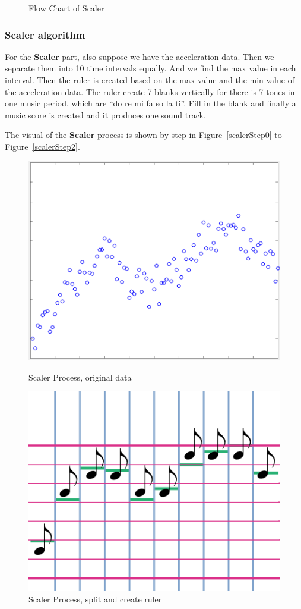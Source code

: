\begin{figure}[H]
\begin{minipage}[b]{0.5\linewidth}
\caption{Flow Chart of Scaler}
\label{FlowMatcher}
\vspace{4ex}
\end{minipage}%
\end{figure}

\subsubsection{Scaler algorithm}

For the \textbf{Scaler} part, also suppose we have the acceleration data. Then
we separate them into 10 time intervals equally. And we find the max value in
each interval. Then the ruler is created based on the max value and the min
value of the acceleration data. The ruler create 7 blanks vertically for there
is 7 tones in one music period, which are ``do re mi fa so la ti''. Fill in the
blank and finally a music score is created and it produces one sound track. 

The visual of the \textbf{Scaler} process is shown by step in
Figure~\ref{scalerStep0} to Figure~\ref{scalerStep2}. 

\begin{figure}[H]
\begin{minipage}[b]{0.5\linewidth}
\centering
\includegraphics[width=0.5\linewidth]{figWR/scaler0}
\caption{Scaler Process, original data}
\label{scalerStep0}
\end{minipage}
%
\begin{minipage}[b]{0.5\linewidth}
\centering
\centering
\includegraphics[width=0.5\linewidth]{figWR/scaler1}
\caption{Scaler Process, split and create ruler}
\label{scalerStep1}
\end{minipage}
\end{figure}


